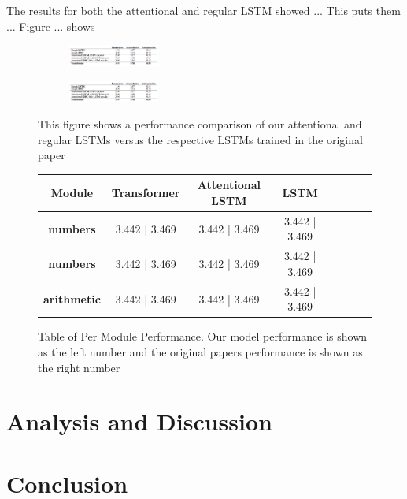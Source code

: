 The results for both the attentional and regular LSTM showed ... This puts them ... Figure ... shows 

\begin{figure}
\centering
\begin{subfigure}{\textwidth}
  \centering
  \includegraphics[width=3cm]{images/test_image.PNG}
  \label{fig:sub1}
\end{subfigure}%
\begin{subfigure}{\textwidth}
  \centering
  \includegraphics[width=3cm]{images/test_image.PNG}
  \label{fig:sub2}
\end{subfigure}
\caption{This figure shows a performance comparison of our attentional and regular LSTMs versus the respective LSTMs trained in the original paper}
\label{fig:test}
\end{figure}


\begin{figure}[h]
\centering
\begin{tabular}{SSSSSSSS} 
    {\textbf{Module}} & {\textbf{Transformer}} & { \textbf{Attentional LSTM }} & {  \textbf{LSTM}} \\ \midrule
    \textbf{numbers}  &  3.442 | 3.469   & 3.442 | 3.469 & 3.442 | 3.469    \\ \midrule
    \textbf{numbers}  & 3.442 | 3.469   & 3.442 | 3.469 & 3.442 | 3.469   \\ \midrule
    \textbf{arithmetic}  & 3.442 | 3.469   & 3.442 | 3.469 & 3.442 | 3.469    \\ \bottomrule
\end{tabular}
\caption{Table of Per Module Performance. Our model performance is shown as the left number and the original papers performance is shown as the right number}
\end{figure}


\section{Analysis and Discussion}


\section{Conclusion}



